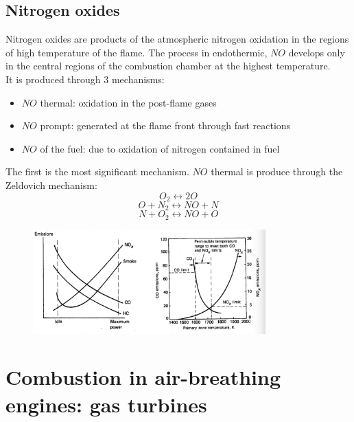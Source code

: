 \documentclass[12pt]{article}
\begin{document}
\subsection{Nitrogen oxides}

Nitrogen oxides are products of the atmospheric nitrogen oxidation in the regions of high temperature of the flame. The process in endothermic, $NO$ develops only in the central regions of the combustion chamber at the highest temperature.\\
It is produced through 3 mechanisms:
\begin{itemize}
    \item $NO$ thermal: oxidation in the post-flame gases
    \item $NO$ prompt: generated at the flame front through fast reactions
    \item $NO$ of the fuel: due to oxidation of nitrogen contained in fuel
\end{itemize}

The first is the most significant mechanism. $NO$ thermal is produce through the Zeldovich mechanism:
\begin{equation}
    O_{2} \leftrightarrow 2O
\end{equation}
\begin{equation}
    O + N_{2} \leftrightarrow NO + N
\end{equation}
\begin{equation}
    N + O_{2} \leftrightarrow NO + O
\end{equation}

\begin{figure}[h!]
\centering
\includegraphics[width=0.8\textwidth]{figures/pollutants.png}
\end{figure}

\newpage

\section{Combustion in air-breathing engines: gas turbines}
\end{document}
